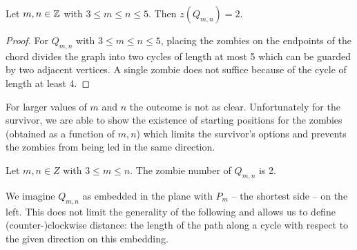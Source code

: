 \begin{lemma}
Let $m,n \in \mathbb{Z}$ with $3 \leq m \leq n \leq 5$. Then $z(Q_{m,n}) = 2$.
\end{lemma}
\begin{proof}
   For $Q_{m,n}$ with $3 \leq m \leq n \leq 5$, placing the zombies on the endpoints
  of the chord divides the graph into two cycles of length at most 5 which can be guarded by two adjacent vertices. A single zombie does not suffice because of the cycle of length at least 4.
\end{proof}

For larger values of $m$ and $n$ the outcome is not as clear. Unfortunately for the survivor, we are able to show the existence of starting positions for the zombies (obtained as a function of $m, n$) which limits the survivor's options and prevents the zombies from being led in the same direction.

\begin{theorem}
 Let $m, n \in Z$ with $3 \leq m \leq n$. The zombie number of $Q_{m,n}$ is 2.
\end{theorem}

We imagine $Q_{m,n}$ as embedded in the plane with $P_m$
-- the shortest side -- on the left.
This does not limit the generality of the following and allows us to define
(counter-)clockwise distance: the length of the path
along a cycle with respect to the given direction on this embedding.


